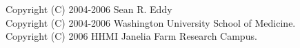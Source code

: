 \vspace*{\fill}
\begin{flushleft}
Copyright (C) 2004-2006 Sean R. Eddy\\
Copyright (C) 2004-2006 Washington University School of Medicine.\\
Copyright (C) 2006 HHMI Janelia Farm Research Campus.\\
\end{flushleft}



